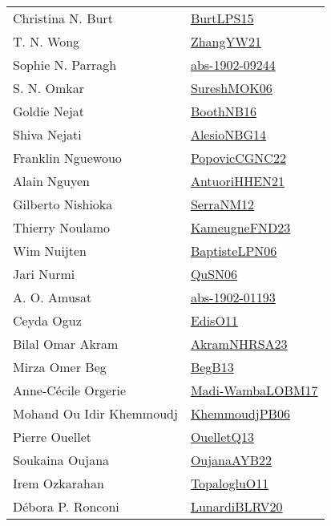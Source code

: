 {\begin{longtable}{p{4cm}p{20cm}}
Christina N. Burt & \href{papers/BurtLPS15.pdf}{BurtLPS15}\cite{BurtLPS15} \\
T. N. Wong & \href{articles/ZhangYW21.pdf}{ZhangYW21}\cite{ZhangYW21} \\
Sophie N. Parragh & \href{articles/abs-1902-09244.pdf}{abs-1902-09244}\cite{abs-1902-09244} \\
S. N. Omkar & \href{}{SureshMOK06}\cite{SureshMOK06} \\
Goldie Nejat & \href{papers/BoothNB16.pdf}{BoothNB16}\cite{BoothNB16} \\
Shiva Nejati & \href{papers/AlesioNBG14.pdf}{AlesioNBG14}\cite{AlesioNBG14} \\
Franklin Nguewouo & \href{papers/PopovicCGNC22.pdf}{PopovicCGNC22}\cite{PopovicCGNC22} \\
Alain Nguyen & \href{papers/AntuoriHHEN21.pdf}{AntuoriHHEN21}\cite{AntuoriHHEN21} \\
Gilberto Nishioka & \href{papers/SerraNM12.pdf}{SerraNM12}\cite{SerraNM12} \\
Thierry Noulamo & \href{papers/KameugneFND23.pdf}{KameugneFND23}\cite{KameugneFND23} \\
Wim Nuijten & \href{}{BaptisteLPN06}\cite{BaptisteLPN06} \\
Jari Nurmi & \href{papers/QuSN06.pdf}{QuSN06}\cite{QuSN06} \\
A. O. Amusat & \href{articles/abs-1902-01193.pdf}{abs-1902-01193}\cite{abs-1902-01193} \\
Ceyda Oguz & \href{papers/EdisO11.pdf}{EdisO11}\cite{EdisO11} \\
Bilal Omar Akram & \href{articles/AkramNHRSA23.pdf}{AkramNHRSA23}\cite{AkramNHRSA23} \\
Mirza Omer Beg & \href{}{BegB13}\cite{BegB13} \\
Anne{-}C{\'{e}}cile Orgerie & \href{papers/Madi-WambaLOBM17.pdf}{Madi-WambaLOBM17}\cite{Madi-WambaLOBM17} \\
Mohand Ou Idir Khemmoudj & \href{papers/KhemmoudjPB06.pdf}{KhemmoudjPB06}\cite{KhemmoudjPB06} \\
Pierre Ouellet & \href{papers/OuelletQ13.pdf}{OuelletQ13}\cite{OuelletQ13} \\
Soukaina Oujana & \href{papers/OujanaAYB22.pdf}{OujanaAYB22}\cite{OujanaAYB22} \\
Irem Ozkarahan & \href{articles/TopalogluO11.pdf}{TopalogluO11}\cite{TopalogluO11} \\
D{\'{e}}bora P. Ronconi & \href{articles/LunardiBLRV20.pdf}{LunardiBLRV20}\cite{LunardiBLRV20} \\

\end{longtable}}
